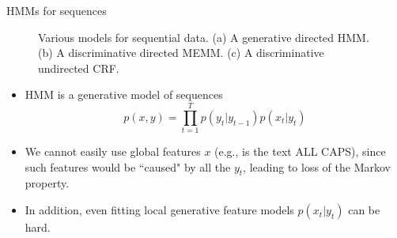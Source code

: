 \documentclass[10pt,mathserif]{beamer}
\begin{document}
\begin{frame}{HMMs for sequences}
\begin{figure}[h]
\centering     %
{}
\caption{Various models for sequential data. (a) A generative directed HMM. (b) A discriminative
directed MEMM. (c) A discriminative undirected CRF.}
\end{figure}

\begin{itemize}
    \item HMM is a generative model of sequences
    \begin{equation}
        p(x, y) =  \prod_{t=1}^T p(y_t |y_{t-1})p(x_t|y_t)
    \end{equation}
    
    \item We cannot easily use global features $x$ (e.g., is the text ALL CAPS), since such features would be ``caused" by all the $y_t$, leading to loss of the Markov property.
    
    \item In addition, even fitting local generative feature models $p(x_t|y_t)$ can be hard.
\end{itemize}
\end{frame}
\end{document}
